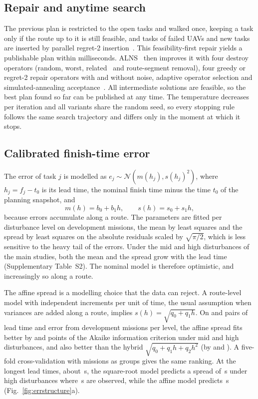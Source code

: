 \subsection{Repair and anytime search}
The previous plan is restricted to the open tasks and walked once, keeping a task only if the route up to it is still
feasible, and tasks of failed UAVs and new tasks are inserted by parallel regret-2
insertion~\cite{potvin1993parallel,ropke2006adaptive}. This feasibility-first repair yields a publishable plan within
milliseconds. ALNS~\cite{ropke2006adaptive} then improves it with four destroy operators (random, worst,
related~\cite{shaw1998cp} and route-segment removal), four greedy or regret-2 repair operators with and without noise,
adaptive operator selection and simulated-annealing acceptance~\cite{kirkpatrick1983annealing}. All intermediate
solutions are feasible, so the best plan found so far can be published at any time. The temperature decreases per
iteration and all variants share the random seed, so every stopping rule follows the same search trajectory and differs
only in the moment at which it stops.

\subsection{Calibrated finish-time error}
The error of task $j$ is modelled as $e_j\sim\mathcal{N}(m(h_j),s(h_j)^2)$, where $h_j=f_j-t_0$ is its lead time, the
nominal finish time minus the time $t_0$ of the planning snapshot, and
\begin{equation}\label{eq:errmodel}
m(h)=b_0+b_1h,\qquad s(h)=s_0+s_1h ,
\end{equation}
because errors accumulate along a route. The parameters are fitted per disturbance level on development missions, the
mean by least squares and the spread by least squares on the absolute residuals scaled by $\sqrt{\pi/2}$, which is less
sensitive to the heavy tail of the errors. Under the mid and high disturbances of the main studies, both the mean and
the spread grow with the lead time (Supplementary Table~S2). The nominal model is therefore optimistic, and
increasingly so along a route.

The affine spread is a modelling choice that the data can reject. A route-level model with independent increments per
unit of time, the usual assumption when variances are added along a route, implies $s(h)=\sqrt{q_0+q_1h}$. On
 and  pairs of lead time and error from  development missions per
level, the affine spread fits better by  and  points of the Akaike information
criterion under mid and high disturbances, and also better than the hybrid $\sqrt{q_0+q_1h+q_2h^2}$ (by
 and ). A five-fold cross-validation with missions as groups gives the same ranking.
At the longest lead times, about \,s, the square-root model predicts a spread of \,s
under high disturbances where \,s are observed, while the affine model predicts \,s
(Fig.~\ref{fig:errstructure}a).

